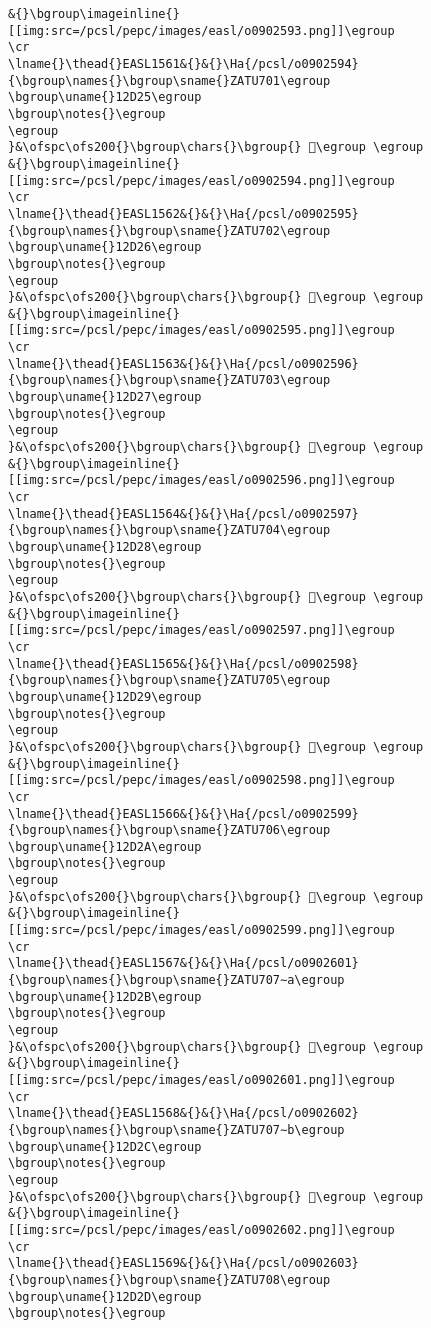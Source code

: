 \begin{verbatim}
&{}\bgroup\imageinline{}[[img:src=/pcsl/pepc/images/easl/o0902593.png]]\egroup
\cr
\lname{}\thead{}EASL1561&{}&{}\Ha{/pcsl/o0902594}{\bgroup\names{}\bgroup\sname{}ZATU701\egroup
\bgroup\uname{}12D25\egroup
\bgroup\notes{}\egroup
\egroup
}&\ofspc\ofs200{}\bgroup\chars{}\bgroup{} 𒴥\egroup \egroup
&{}\bgroup\imageinline{}[[img:src=/pcsl/pepc/images/easl/o0902594.png]]\egroup
\cr
\lname{}\thead{}EASL1562&{}&{}\Ha{/pcsl/o0902595}{\bgroup\names{}\bgroup\sname{}ZATU702\egroup
\bgroup\uname{}12D26\egroup
\bgroup\notes{}\egroup
\egroup
}&\ofspc\ofs200{}\bgroup\chars{}\bgroup{} 𒴦\egroup \egroup
&{}\bgroup\imageinline{}[[img:src=/pcsl/pepc/images/easl/o0902595.png]]\egroup
\cr
\lname{}\thead{}EASL1563&{}&{}\Ha{/pcsl/o0902596}{\bgroup\names{}\bgroup\sname{}ZATU703\egroup
\bgroup\uname{}12D27\egroup
\bgroup\notes{}\egroup
\egroup
}&\ofspc\ofs200{}\bgroup\chars{}\bgroup{} 𒴧\egroup \egroup
&{}\bgroup\imageinline{}[[img:src=/pcsl/pepc/images/easl/o0902596.png]]\egroup
\cr
\lname{}\thead{}EASL1564&{}&{}\Ha{/pcsl/o0902597}{\bgroup\names{}\bgroup\sname{}ZATU704\egroup
\bgroup\uname{}12D28\egroup
\bgroup\notes{}\egroup
\egroup
}&\ofspc\ofs200{}\bgroup\chars{}\bgroup{} 𒴨\egroup \egroup
&{}\bgroup\imageinline{}[[img:src=/pcsl/pepc/images/easl/o0902597.png]]\egroup
\cr
\lname{}\thead{}EASL1565&{}&{}\Ha{/pcsl/o0902598}{\bgroup\names{}\bgroup\sname{}ZATU705\egroup
\bgroup\uname{}12D29\egroup
\bgroup\notes{}\egroup
\egroup
}&\ofspc\ofs200{}\bgroup\chars{}\bgroup{} 𒴩\egroup \egroup
&{}\bgroup\imageinline{}[[img:src=/pcsl/pepc/images/easl/o0902598.png]]\egroup
\cr
\lname{}\thead{}EASL1566&{}&{}\Ha{/pcsl/o0902599}{\bgroup\names{}\bgroup\sname{}ZATU706\egroup
\bgroup\uname{}12D2A\egroup
\bgroup\notes{}\egroup
\egroup
}&\ofspc\ofs200{}\bgroup\chars{}\bgroup{} 𒴪\egroup \egroup
&{}\bgroup\imageinline{}[[img:src=/pcsl/pepc/images/easl/o0902599.png]]\egroup
\cr
\lname{}\thead{}EASL1567&{}&{}\Ha{/pcsl/o0902601}{\bgroup\names{}\bgroup\sname{}ZATU707∼a\egroup
\bgroup\uname{}12D2B\egroup
\bgroup\notes{}\egroup
\egroup
}&\ofspc\ofs200{}\bgroup\chars{}\bgroup{} 𒴫\egroup \egroup
&{}\bgroup\imageinline{}[[img:src=/pcsl/pepc/images/easl/o0902601.png]]\egroup
\cr
\lname{}\thead{}EASL1568&{}&{}\Ha{/pcsl/o0902602}{\bgroup\names{}\bgroup\sname{}ZATU707∼b\egroup
\bgroup\uname{}12D2C\egroup
\bgroup\notes{}\egroup
\egroup
}&\ofspc\ofs200{}\bgroup\chars{}\bgroup{} 𒴬\egroup \egroup
&{}\bgroup\imageinline{}[[img:src=/pcsl/pepc/images/easl/o0902602.png]]\egroup
\cr
\lname{}\thead{}EASL1569&{}&{}\Ha{/pcsl/o0902603}{\bgroup\names{}\bgroup\sname{}ZATU708\egroup
\bgroup\uname{}12D2D\egroup
\bgroup\notes{}\egroup

\end{verbatim}
